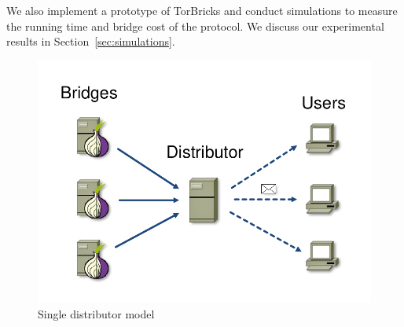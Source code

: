 \documentclass{sig-alternate-05-2015}
\newcommand{\todo}[1]{{\leavevmode\color{blue}[TODO: #1]}}
\newcommand{\bricks}{}
\def\bricks/{\mbox{TorBricks}}
\begin{document}
We also implement a prototype of \bricks/ and conduct simulations to measure the running time and bridge cost of the protocol. We discuss our experimental results in Section~\ref{sec:simulations}.

\begin{figure}[t]
	\centering
	\includegraphics[width=0.7\linewidth]{images/single-alg}
	\caption{Single distributor model}
	\label{fig:singledist}
\end{figure}

\end{document}
